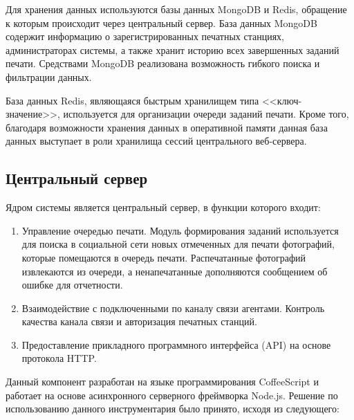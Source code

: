 \documentclass[a4paper,14pt,href,draft]{article}
\begin{document}
Для хранения данных используются базы данных MongoDB и Redis, обращение к которым происходит через центральный сервер.
База данных MongoDB содержит информацию о зарегистрированных печатных станциях, администраторах системы, а также хранит
историю всех завершенных заданий печати. Средствами MongoDB реализована возможность гибкого поиска и
фильтрации данных\cite{MongoDBBook}.

База данных Redis, являющаяся быстрым хранилищем типа <<ключ-значение>>, используется для организации очереди
заданий печати. Кроме того, благодаря возможности хранения данных в оперативной памяти данная база данных выступает в
роли хранилища сессий центрального веб-сервера.

\subsection{Центральный сервер}
Ядром системы является центральный сервер, в функции которого входит:

\begin{enumerate}
  \item Управление очередью печати. Модуль формирования заданий используется для поиска в социальной сети новых
  отмеченных для печати фотографий, которые помещаются в очередь печати. Распечатанные фотографий извлекаются из
  очереди, а ненапечатанные дополняются сообщением об ошибке для отчетности.

  \item Взаимодействие с подключенными по каналу связи агентами. Контроль качества канала связи и авторизация
  печатных станций.

  \item Предоставление прикладного программного интерфейса (API) на основе протокола HTTP.
\end{enumerate}

Данный компонент разработан на языке программирования \linebreak CoffeeScript\cite{LittleCoffeeScript} и работает
на основе асинхронного серверного фреймворка Node.js. Решение по использованию данного инструментария было принято,
исходя из следующего:
\end{document}
